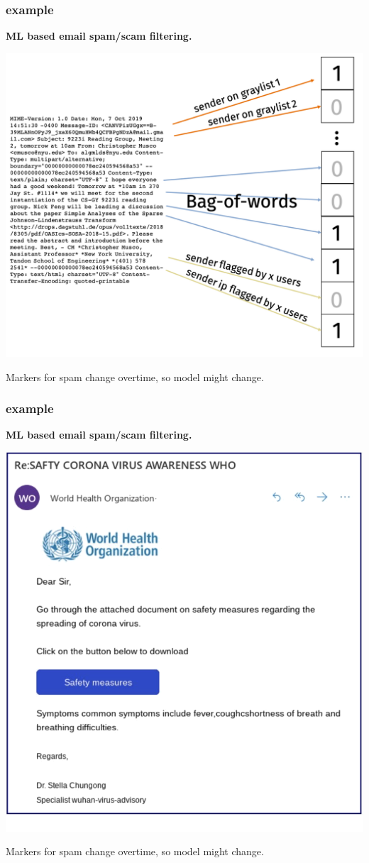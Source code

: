 \documentclass[compress]{beamer}
\begin{document}
\begin{frame}
	\frametitle{example}
		\begin{center}
		\textbf{ML based email spam/scam filtering.}
	\end{center}
	\begin{center}
		\includegraphics[width=.5\textwidth]{spam_features.png}
	\end{center}
Markers for spam change overtime, so model might change.
\end{frame}

\begin{frame}
	\frametitle{example}
	\begin{center}
		\textbf{ML based email spam/scam filtering.}
	\end{center}
	\begin{center}
		\includegraphics[width=.4\textwidth]{covid_spam.png}
	\end{center}
	Markers for spam change overtime, so model might change.
\end{frame}
\end{document}

